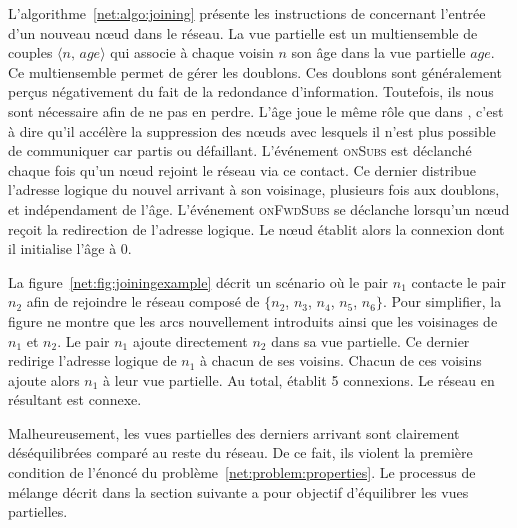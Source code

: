 L'algorithme~\ref{net:algo:joining} présente les instructions de \SPRAY
concernant l'entrée d'un nouveau nœud dans le réseau. La vue partielle est un
multiensemble de couples $\langle n,\, age\rangle$ qui associe à chaque voisin
$n$ son âge dans la vue partielle $age$. Ce multiensemble permet de gérer les
doublons. Ces doublons sont généralement perçus négativement du fait de la
redondance d'information. Toutefois, ils nous sont nécessaire afin de ne pas en
perdre. L'âge joue le même rôle que dans \CYCLON, c'est à dire qu'il accélère la
suppression des nœuds avec lesquels il n'est plus possible de communiquer car
partis ou défaillant. L'événement \textsc{onSubs} est déclanché chaque fois qu'un
nœud rejoint le réseau via ce contact. Ce dernier distribue l'adresse logique du
nouvel arrivant à son voisinage, plusieurs fois aux doublons, et indépendament
de l'âge. L'événement \textsc{onFwdSubs} se déclanche lorsqu'un nœud reçoit la
redirection de l'adresse logique. Le nœud établit alors la connexion dont il
initialise l'âge à $0$.

La figure~\ref{net:fig:joiningexample} décrit un scénario où le pair $n_1$
contacte le pair $n_2$ afin de rejoindre le réseau composé de $\{n_2$, $n_3$,
$n_4$, $n_5$, $n_6\}$. Pour simplifier, la figure ne montre que les arcs
nouvellement introduits ainsi que les voisinages de $n_1$ et $n_2$. Le pair
$n_1$ ajoute directement $n_2$ dans sa vue partielle. Ce dernier redirige
l'adresse logique de $n_1$ à chacun de ses voisins.  Chacun de ces voisins
ajoute alors $n_1$ à leur vue partielle. Au total, \SPRAY établit 5
connexions. Le réseau en résultant est connexe.

Malheureusement, les vues partielles des derniers arrivant sont clairement
déséquilibrées comparé au reste du réseau. De ce fait, ils violent la première
condition de l'énoncé du problème~\ref{net:problem:properties}. Le processus de
mélange décrit dans la section suivante a pour objectif d'équilibrer les vues
partielles.



